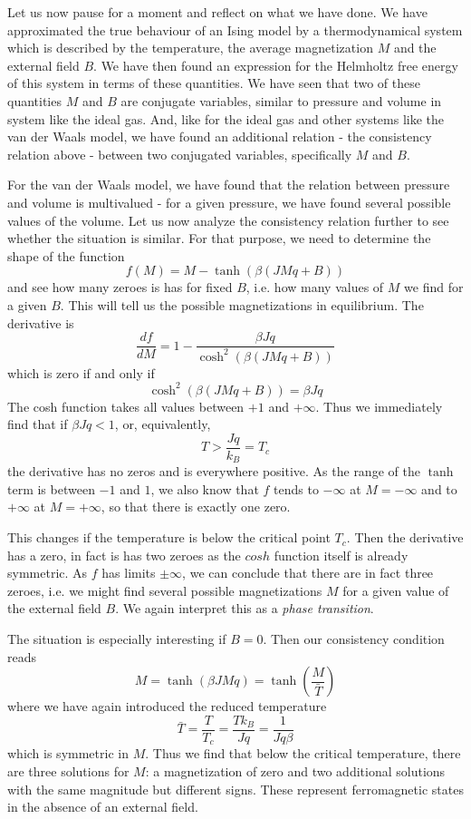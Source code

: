\documentclass[a4paper, draft]{article}
\theoremstyle{own}
\theoremstyle{remark}
\begin{document}
Let us now pause for a moment and reflect on what we have done. We have approximated the true behaviour of an Ising model by a thermodynamical system which is described by the temperature, the average magnetization $M$ and the external field $B$. We have then found an expression for the Helmholtz free energy of this system in terms of these quantities. We have seen that two of these quantities $M$ and $B$ are conjugate variables, similar to pressure and volume in system like the ideal gas. And, like for the ideal gas and other systems like the van der Waals model, we have found an additional relation - the consistency relation above - between two conjugated variables, specifically $M$ and $B$. 

For the van der Waals model, we have found that the relation between pressure and volume is multivalued - for a given pressure, we have found several possible values of the volume. Let us now analyze the consistency relation further to see whether the situation is similar. For that purpose, we need to determine the shape of the function
$$
f(M) = M -  \tanh (\beta (J M q + B)) 
$$
and see how many zeroes is has for fixed $B$, i.e. how many values of $M$ we find for a given $B$. This will tell us the possible magnetizations in equilibrium. The derivative is
$$
\frac{df}{dM} = 1 - \frac{\beta J q}{\cosh^2 (\beta (J M q + B))} 		
$$
which is zero if and only if
$$
\cosh^2 (\beta (J M q + B)) = \beta J q
$$
The cosh function takes all values between $+1$ and $+\infty$. Thus we immediately find that if $\beta J q < 1$, or, equivalently,
$$
T > \frac{Jq}{k_B} = T_c
$$
the derivative has no zeros and is everywhere positive. As the range of the $\tanh$ term is between $-1$ and $1$, we also know that $f$ tends to $-\infty$ at $M = -\infty$ and to $+\infty$ at $M = +\infty$, so that there is exactly one zero.

This changes if the temperature is below the critical point $T_c$. Then the derivative has a zero, in fact is has two zeroes as the $cosh$ function itself is already symmetric. As $f$ has limits $\pm \infty$, we can conclude that there are in fact three zeroes, i.e. we might find several possible magnetizations $M$ for a given value of the external field $B$. We again interpret this as a {\em phase transition}. 

The situation is especially interesting if $B = 0$. Then our consistency condition reads
$$
M = \tanh (\beta J M q ) = \tanh(\frac{M}{\bar{T}})
$$
where we have again introduced the reduced temperature
$$
\bar{T} = \frac{T}{T_c} = \frac{T k_B}{Jq} = \frac{1}{Jq\beta}
$$
which is symmetric in $M$. Thus we find that below the critical temperature, there are three solutions for $M$: a magnetization of zero and two additional solutions with the same magnitude but different signs. These represent ferromagnetic states in the absence of an external field.
\end{document}
